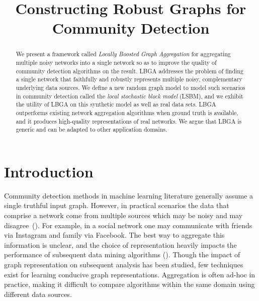 \documentclass{article}
\title{\Large Constructing Robust Graphs for Community Detection}
\begin{document}

\maketitle

\begin{abstract} 

We present a framework called \emph{Locally Boosted Graph Aggregation} for
aggregating multiple noisy networks into a single network so as to improve the
quality of community detection algorithms on the result. LBGA addresses the
problem of finding a single network that faithfully and robustly represents
multiple noisy, complementary underlying data sources. We define a new random
graph model to model such scenarios in community detection called the
\emph{local stochastic block model} (LSBM), and we exhibit the utility of LBGA
on this synthetic model as well as real data sets. LBGA outperforms existing
network aggregation algorithms when ground truth is available, and it produces
high-quality representations of real networks. We argue that LBGA is generic
and can be adapted to other application domains.

\end{abstract}

\section{Introduction}
Community detection methods in machine learning literature generally assume a
single truthful input graph. However, in practical scenarios the data that
comprise a network come from multiple sources which may be noisy and may
disagree~(\cite{Leskovec2008}). For example, in a social network one may
communicate with friends via Instagram and family via Facebook. The best way to
aggregate this information is unclear, and the choice of representation heavily
impacts the performance of subsequent data mining algorithms
(\cite{Getoor2005,Caceres2011,Miller2014}).  Though the impact of graph
representation on subsequent analysis has been studied, few techniques exist
for learning conducive graph representations. Aggregation is often ad-hoc in
practice, making it difficult to compare algorithms within the same domain
using different data sources.
\end{document}
